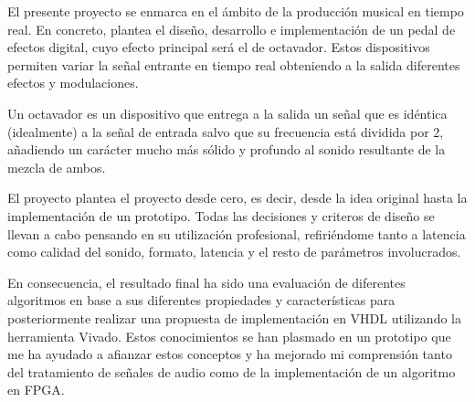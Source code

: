 El presente proyecto se enmarca en el ámbito de la producción musical en tiempo real. En concreto, plantea el diseño, desarrollo e implementación de un pedal de efectos digital, cuyo efecto principal será el de octavador. Estos dispositivos permiten variar la señal entrante en tiempo real obteniendo a la salida diferentes efectos y modulaciones. 

Un octavador es un dispositivo que entrega a la salida un señal que es idéntica (idealmente) a la señal de entrada salvo que su frecuencia está dividida por 2, añadiendo un carácter mucho más sólido y profundo al sonido resultante de la mezcla de ambos. 

El proyecto plantea el proyecto desde cero, es decir, desde la idea original hasta la implementación de un prototipo. Todas las decisiones y criteros de diseño se llevan a cabo pensando en su utilización profesional, refiriéndome tanto a latencia como calidad del sonido, formato, latencia y el resto de parámetros involucrados.

En consecuencia, el resultado final ha sido una evaluación de diferentes algoritmos en base a sus diferentes propiedades y características para posteriormente realizar una propuesta de implementación en VHDL utilizando la herramienta Vivado. Estos conocimientos se han plasmado en un prototipo que me ha ayudado a afianzar estos conceptos y ha mejorado mi comprensión tanto del tratamiento de señales de audio como de la implementación de un algoritmo en FPGA.
